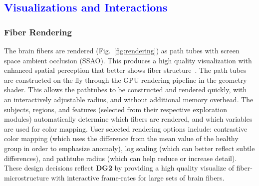 \subsection{\textcolor{blue}{Visualizations and Interactions}}
\subsubsection{Fiber Rendering}
\label{sec:rendering}

\noindent The brain fibers are rendered (Fig.~\ref{fig:rendering}) as path tubes with screen space ambient occlusion (SSAO). This produces a high quality visualization with enhanced spatial perception that better shows fiber structure~\cite{mittring2007finding, eichelbaum2013lineao}. The path tubes are constructed on the fly through the GPU rendering pipeline in the geometry shader. This allows the pathtubes to be constructed and rendered quickly, with an interactively adjustable radius, and without additional memory overhead. The subjects, regions, and features (selected from their respective exploration modules) automatically determine which fibers are rendered, and which variables are used for color mapping.  User selected rendering options include: contrastive color mapping (which uses the difference from the mean value of the healthy group in order to emphasize anomaly), log scaling (which can better reflect subtle differences), and pathtube radius (which can help reduce or increase detail). These design decisions reflect \textbf{DG2} by providing a high quality visualize of fiber-microstructure with interactive frame-rates for large sets of brain fibers. 


